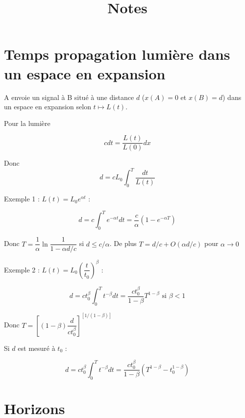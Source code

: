 \documentclass[11pt]{article} %
\title{Notes}
\author{}
\date{} %
\newcommand{\dint}{\displaystyle \int}
\begin{document}
\maketitle

\section{Temps propagation lumière dans un espace en expansion}

A envoie un signal à B situé à une distance $d$ ($x(A) = 0$ et $x(B) = d$) dans un espace en expansion selon $t \mapsto L(t)$. 

Pour la lumière

\begin{equation}
c dt = \dfrac{L(t)}{L(0)} dx
\end{equation}

Donc \begin{equation}
d = cL_0 \dint_0^T \dfrac{dt}{L(t)}
\end{equation}


Exemple 1 : $L(t) = L_0 e^{\alpha t}$ :

 \begin{equation}
d = c \dint_0^T e^{-\alpha t} dt = \dfrac{c}{\alpha} \left ( 1 - e^{-\alpha T} \right )
\end{equation}

Donc $T = \dfrac{1}{\alpha} \ln { \dfrac{1}{1-\alpha d/c}}$ si $d \leq c/\alpha$.
De plus $T = d/c + O(\alpha d/c)$ pour $\alpha \to 0$

Exemple 2 : $L(t) = L_0 \left ( \dfrac{t}{t_0} \right )^\beta$ :

 \begin{equation}
d = c t_0 ^\beta \dint_0^T t^{-\beta} dt = \dfrac{ct_0^\beta} {1-\beta}  T^{1-\beta}  \textrm{ si } \beta < 1
\end{equation}

Donc $T = \left [ (1-\beta) \dfrac{d}{ct_0^\beta} \right ] ^ { \left [1/(1-\beta)\right ] }$

Si $d$ est mesuré à $t_0$ :

 \begin{equation}
d = c t_0 ^\beta \dint_0^T t^{-\beta} dt = \dfrac{ct_0^\beta} {1-\beta}  \left ( T^{1-\beta} - t_0^{1-\beta} \right ) 
\end{equation}

\section{Horizons}
\end{document}
